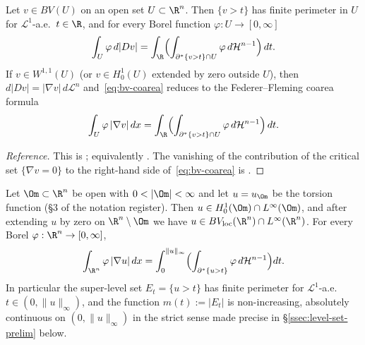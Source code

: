 \begin{theorem}\label{thm:bv-coarea}
Let $v\in BV(U)$ on an open set $U\subset\R^n$.  Then $\{v>t\}$ has
finite perimeter in $U$ for $\mathcal L^1$-a.e.\ $t\in\R$, and for
every Borel function $\varphi:U\to[0,\infty]$
\begin{equation}\label{eq:bv-coarea}
   \int_U \varphi\,d|Dv|
   =\int_\R\Bigl(\int_{\partial^*\{v>t\}\cap U}\varphi\,d\mathcal H^{n-1}
      \Bigr)\,dt.
\end{equation}
If $v\in W^{1,1}(U)$ (or $v\in H^1_0(U)$ extended by zero outside
$U$), then $d|Dv|=|\nabla v|\,d\mathcal L^n$ and~\eqref{eq:bv-coarea}
reduces to the Federer--Fleming coarea formula
\begin{equation}\label{eq:fed-fleming}
   \int_U\varphi\,|\nabla v|\,dx
   =\int_\R\Bigl(\int_{\partial^*\{v>t\}\cap U}\varphi\,d\mathcal H^{n-1}
      \Bigr)\,dt.
\end{equation}
\end{theorem}

\begin{proof}[Reference]
This is \cite[Thm.~13.1 and Thm.~18.1]{Maggi2012}; equivalently
\cite[Thm.~3.40 and (3.40)(b)]{AFP2000}.  The vanishing of the
contribution of the critical set $\{\nabla v=0\}$ to the
right-hand side of~\eqref{eq:bv-coarea} is \cite[Thm.~3.40(b)]{AFP2000}.
\end{proof}

\begin{corollary}
\label{cor:coarea-torsion}
Let $\Om\subset\R^n$ be open with $0<|\Om|<\infty$ and let $u=u_\Om$ be
the torsion function (\S 3 of the notation register).  Then $u\in
H^1_0(\Om)\cap L^\infty(\Om)$, and after extending $u$ by zero on
$\R^n\setminus\Om$ we have $u\in BV_{\rm loc}(\R^n)\cap L^\infty(\R^n)$.
For every Borel $\varphi:\R^n\to[0,\infty]$,
\begin{equation}\label{eq:coarea-u}
   \int_{\R^n}\varphi\,|\nabla u|\,dx
   =\int_0^{\|u\|_\infty}
      \Bigl(\int_{\partial^*\{u>t\}}\varphi\,d\mathcal H^{n-1}\Bigr)dt.
\end{equation}
In particular the super-level set $E_t=\{u>t\}$ has finite perimeter
for $\mathcal L^1$-a.e.\ $t\in(0,\|u\|_\infty)$, and the function
$m(t):=|E_t|$ is non-increasing, absolutely continuous on
$(0,\|u\|_\infty)$ in the strict sense made precise in
\S\ref{ssec:level-set-prelim} below.
\end{corollary}

